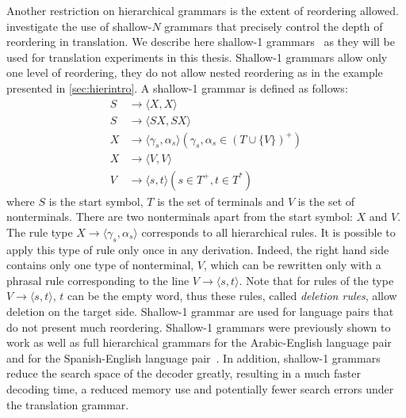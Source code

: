   Another restriction on hierarchical grammars is the extent of reordering allowed. \citet{degispert-iglesias-blackwood-banga-byrne:2010:CL} investigate the use
  of shallow-$N$ grammars that precisely control the depth of reordering in translation. We describe here 
  shallow-1 grammars~\citep{iglesias-degispert-banga-byrne:2009:EACL,degispert-iglesias-blackwood-banga-byrne:2010:CL} as
  they will be used for translation experiments in this thesis. Shallow-1 grammars
  allow only one level of reordering, they do not allow nested reordering as in the example presented in \autoref{sec:hierintro}.
  A shallow-1
  grammar is defined as follows:
%  
  \begin{align*}
    S &\rightarrow \langle X , X \rangle \\
    S &\rightarrow \langle S X , S X \rangle \\
    X &\rightarrow \langle \gamma_s , \alpha_s \rangle (\gamma_s, \alpha_s \in (T \cup \{V\})^{+}) \\
    X &\rightarrow \langle V , V \rangle \\
    V &\rightarrow \langle s , t \rangle (s \in T^{+}, t \in  T^{*})
  \end{align*}
%  
  where $S$ is the start symbol, $T$ is the set of terminals and $V$ is the set of nonterminals. There are two nonterminals
  apart from the start symbol: $X$ and $V$. The rule type $X \rightarrow \langle \gamma_s , \alpha_s \rangle$ corresponds
  to all hierarchical rules. It is possible to apply this type of rule only once in any derivation. Indeed, the
  right hand side contains only one type of nonterminal, $V$, which can be rewritten only with a phrasal rule corresponding
  to the line $V \rightarrow \langle s , t \rangle$. Note that for rules of the type $V \rightarrow \langle s , t \rangle$, $t$ can be
  the empty word, thus these rules, called {\em deletion rules}, allow deletion on the target side. Shallow-1 grammar are used for language pairs that do not present
  much reordering. Shallow-1 grammars were previously shown to work as well as full hierarchical grammars
  for the Arabic-English language pair~\citep{iglesias-degispert-banga-byrne:2009:EACL} and for
  the Spanish-English language pair~\citep{iglesias-degispert-banga-byrne:2009:SEPLN}.
  In addition, shallow-1 grammars reduce the search space of the decoder greatly, resulting in a much faster decoding
  time, a reduced memory use and potentially fewer search errors under the translation grammar.


